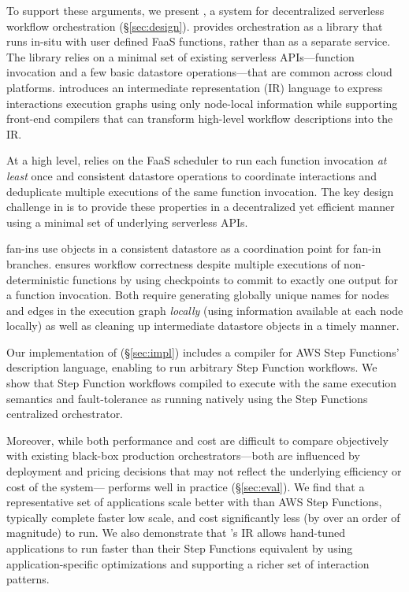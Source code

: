 To support these arguments, we present \name{}, a system for decentralized
serverless workflow orchestration (\S\ref{sec:design}). \name{} provides
orchestration as a library that runs in-situ with user defined FaaS functions,
rather than as a separate service. The library relies on a minimal set of
existing serverless APIs---function invocation and a few basic datastore
operations---that are common across cloud platforms. \name{} introduces an
intermediate representation (IR) language to express interactions execution
graphs using only node-local information while supporting front-end compilers
that can transform high-level workflow descriptions into the IR.

At a high level, \name{} relies on the FaaS scheduler to run each function
invocation \emph{at least} once and consistent datastore operations to
coordinate interactions and deduplicate multiple executions of the same function
invocation. The key design challenge in \name{} is to provide these properties
in a decentralized yet efficient manner using a minimal set of underlying
serverless APIs.

\name{} fan-ins use objects in a consistent datastore as a coordination point
for fan-in branches. \name{} ensures workflow correctness despite multiple
executions of non-deterministic functions by using checkpoints to commit to
exactly one output for a function invocation. Both require generating globally
unique names for nodes and edges in the execution graph \emph{locally} (using
information available at each node locally) as well as cleaning up intermediate
datastore objects in a timely manner.

Our implementation of \name{} (\S\ref{sec:impl}) includes a compiler for AWS Step
Functions' description language, enabling \name{} to run arbitrary Step Function
workflows.  We show that Step Function workflows compiled to \name{} execute
with the same execution semantics and fault-tolerance as running natively using
the Step Functions centralized orchestrator.

Moreover, while both performance and cost are difficult to compare objectively
with existing black-box production orchestrators---both are influenced by
deployment and pricing decisions that may not reflect the underlying efficiency
or cost of the system---\name{} performs well in practice (\S\ref{sec:eval}). We
find that a representative set of applications scale better with \name{} than
AWS Step Functions, typically complete faster low scale, and cost
significantly less (by over an order of magnitude) to run. We also demonstrate
that \name{}'s IR allows hand-tuned applications to run faster than their Step
Functions equivalent by using application-specific optimizations and supporting
a richer set of interaction patterns.
